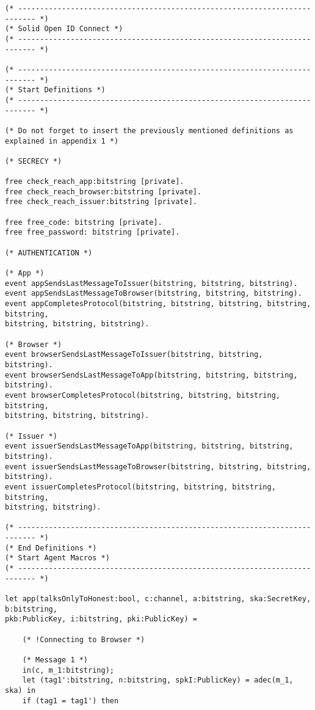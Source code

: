\begin{Verbatim}[fontsize=\small]
(* -------------------------------------------------------------------------- *)
(* Solid Open ID Connect *)
(* -------------------------------------------------------------------------- *)

(* -------------------------------------------------------------------------- *)
(* Start Definitions *)
(* -------------------------------------------------------------------------- *)

(* Do not forget to insert the previously mentioned definitions as explained in appendix 1 *)

(* SECRECY *)

free check_reach_app:bitstring [private].
free check_reach_browser:bitstring [private].
free check_reach_issuer:bitstring [private].

free free_code: bitstring [private].
free free_password: bitstring [private].

(* AUTHENTICATION *)

(* App *)
event appSendsLastMessageToIssuer(bitstring, bitstring, bitstring).
event appSendsLastMessageToBrowser(bitstring, bitstring, bitstring).
event appCompletesProtocol(bitstring, bitstring, bitstring, bitstring, bitstring, 
bitstring, bitstring, bitstring).

(* Browser *)
event browserSendsLastMessageToIssuer(bitstring, bitstring, bitstring).
event browserSendsLastMessageToApp(bitstring, bitstring, bitstring, bitstring).
event browserCompletesProtocol(bitstring, bitstring, bitstring, bitstring, 
bitstring, bitstring, bitstring).

(* Issuer *)
event issuerSendsLastMessageToApp(bitstring, bitstring, bitstring, bitstring).
event issuerSendsLastMessageToBrowser(bitstring, bitstring, bitstring, bitstring).
event issuerCompletesProtocol(bitstring, bitstring, bitstring, bitstring, 
bitstring, bitstring).

(* -------------------------------------------------------------------------- *)
(* End Definitions *)
(* Start Agent Macros *)
(* -------------------------------------------------------------------------- *)

let app(talksOnlyToHonest:bool, c:channel, a:bitstring, ska:SecretKey, b:bitstring, 
pkb:PublicKey, i:bitstring, pki:PublicKey) =

    (* !Connecting to Browser *)

    (* Message 1 *)
    in(c, m_1:bitstring);
    let (tag1':bitstring, n:bitstring, spkI:PublicKey) = adec(m_1, ska) in
    if (tag1 = tag1') then


\end{Verbatim}
